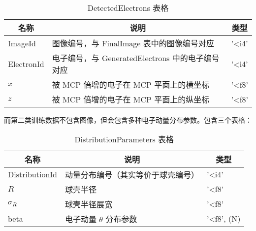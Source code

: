 \documentclass{article}
\begin{document}
\begin{table}[H]
    \caption{DetectedElectrons 表格}
        \label{tab:DetectedElectrons}
        \centering
        {
            \begin{tabular}[c]{l|l|l}
                \hline
                \multicolumn{1}{c|}{\textbf{名称}} & 
                \multicolumn{1}{c|}{\textbf{说明}} & 
                \multicolumn{1}{c}{\textbf{类型}} \\
                \hline
                ImageId & 图像编号，与 FinalImage 表中的图像编号对应 & '<i4' \\
                ElectronId & 电子编号，与 GeneratedElectrons 中的电子编号对应 & '<i4' \\
                $x$ & 被 MCP 倍增的电子在 MCP 平面上的横坐标 & '<f8' \\
                $z$ & 被 MCP 倍增的电子在 MCP 平面上的纵坐标 & '<f8' \\
                \hline
            \end{tabular}
        }
\end{table}

而第二类训练数据不包含图像，但会包含多种电子动量分布参数。包含三个表格：

\begin{table}[H]
    \caption{DistributionParameters 表格}
        \label{tab:DistributionParameters}
        \centering
        {
            \begin{tabular}[c]{l|l|l}
                \hline
                \multicolumn{1}{c|}{\textbf{名称}} & 
                \multicolumn{1}{c|}{\textbf{说明}} & 
                \multicolumn{1}{c}{\textbf{类型}} \\
                \hline
                DistributionId & 动量分布编号（其实等价于球壳编号） & '<i4' \\
                $R$ & 球壳半径 & '<f8' \\
                $\sigma_R$ & 球壳半径展宽 & '<f8' \\
                beta& 电子动量 $\theta$ 分布参数 & '<f8', (N)\\
                \hline
            \end{tabular}
        }
\end{table}
\end{document}
